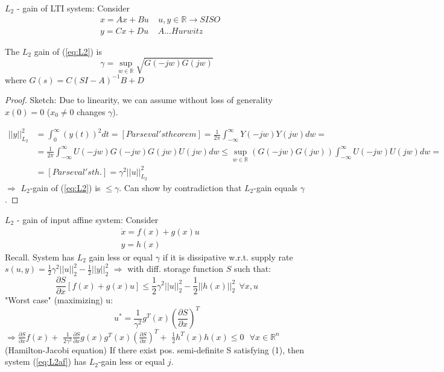 $L_2$ - gain of LTI system:
 Consider 
 \begin{equation} \label{eq:L2}
\begin{split}
&x=Ax+Bu \ \ \ \ \ u,y\in\mathbb{R}\rightarrow SISO\\
&y=Cx+Du \ \ \ \ \ A ... Hurwitz
\end{split}
\end{equation}
 \begin{Lemma}
The $L_2$ gain of (\ref{eq:L2}) is
$$\gamma=\sup_{w\in\mathbb{R}}\sqrt{G(-jw)G(jw)}$$
 where $G(s)=C(SI-A)^{-1}B+D$
\begin{proof}
 Sketch:
  Due to linearity, we can assume without loss of generality $x(0)=0$ ($x_0 \ne 0$ changes $\gamma$).
  
 \begin{equation*}
  \begin{split}
   ||y||^2_{L_2} &=\int_0^\infty (y(t))^2dt = [Parseval's theorem]=\frac{1}{2\pi}\int_{-\infty}^\infty Y(-jw)Y(jw)dw=\\
                 &=\frac{1}{2\pi}\int_{-\infty}^\infty U(-jw)G(-jw)G(jw)U(jw)dw\le\sup_{w\in\mathbb{R}} (G(-jw)G(jw))\int_{-\infty}^\infty U(-jw)U(jw)dw=\\
                 &=[Parseval's th.] = \gamma^2 ||u||_{L_2}^2
  \end{split}
 \end{equation*}
  $\Rightarrow$ $L_2$-gain of (\ref{eq:L2}) is $\le\gamma$.
  Can show by contradiction that $L_2$-gain equals $\gamma$.
\end{proof}
\end{Lemma}
 $L_2$ - gain of input affine system:
 Consider
 \begin{equation} \label{eq:L2af}
\begin{split}
&\dot x = f(x) +g(x)u\\
&y = h(x)
\end{split}
\end{equation}
 Recall. System has $L_2$ gain less or equal $\gamma$ if it is dissipative w.r.t. supply
rate $s(u,y)=\frac{1}{2}\gamma^2||u||^2_2-\frac{1}{2}||y||_2^2$
 $\Rightarrow$ with diff. storage function $S$ such that:
 $$\frac{\partial S}{\partial x} [f(x)+g(x)u] \le \frac{1}{2}\gamma^2||u||^2_2-\frac{1}{2}||h(x)||_2^2\ \ \forall x,u$$
 "Worst case" (maximizing) u:
 $$u^*=\frac{1}{\gamma^2} g^T(x)\left(\frac{\partial S}{\partial x}\right)^T$$
 $\Rightarrow \frac{\partial S}{\partial x} f(x)+$
$\frac{1}{2\gamma^2}\frac{\partial S}{\partial x}g(x)g^T(x)\left(\frac{\partial S}{\partial x}\right)^T+$
$\frac{1}{2}h^T(x)h(x)\le 0 \ \ \ \forall x\in\mathbb{R}^n$ (Hamilton-Jacobi equation)
 If there exist pos. semi-definite S satisfying (1), then system (\ref{eq:L2af}) has $L_2$-gain
less or equal $j$.